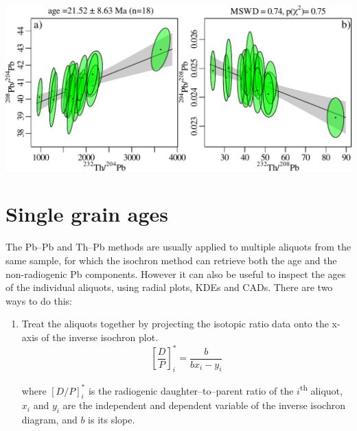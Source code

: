 \begin{refsection}
\noindent\begin{minipage}[t][][b]{.7\linewidth}
\includegraphics[width=\textwidth]{../figures/ThPb.pdf}
\end{minipage}
\begin{minipage}[t][][t]{.3\linewidth}
\end{minipage}

\section{Single grain ages}\label{sec:ThPbPbradial}

The Pb--Pb and Th--Pb methods are usually applied to multiple aliquots
from the same sample, for which the isochron method can retrieve both
the age and the non-radiogenic Pb components. However it can also be
useful to inspect the ages of the individual aliquots, using radial
plots, KDEs and CADs. There are two ways to do this:

\begin{enumerate}
  \item Treat the aliquots together by projecting the isotopic ratio
    data onto the x-axis of the inverse isochron plot.
    \begin{equation}
      \left[\frac{D}{P}\right]_i^\ast = \frac{b}{b x_i - y_i}
      \label{eq:DP*inverse}
    \end{equation}
    
    \noindent where $[D/P]_i^\ast$ is the radiogenic
    daughter--to--parent ratio of the $i$\textsuperscript{th} aliquot,
    $x_i$ and $y_i$ are the independent and dependent variable of the
    inverse isochron diagram, and $b$ is its slope.


\end{enumerate}
\end{refsection}
